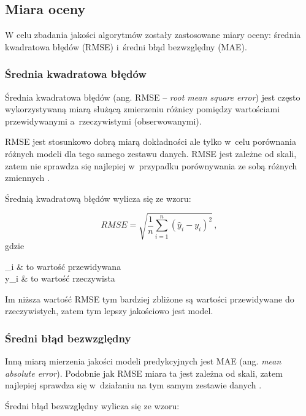 \documentclass[twoside]{iisthesis}
\begin{document}
		\subsection{Miara oceny}
		
		W celu zbadania jakości algorytmów zostały zastosowane miary oceny: średnia kwadratowa błędów (RMSE) i~średni błąd bezwzględny (MAE).
		
		\subsubsection{Średnia kwadratowa błędów}
	
		Średnia kwadratowa błędów (ang. RMSE -- \textit{root mean square error}) jest często wykorzystywaną miarą służącą zmierzeniu różnicy pomiędzy wartościami przewidywanymi a~rzeczywistymi (obserwowanymi). 
		
		RMSE jest stosunkowo dobrą miarą dokładności ale tylko w~celu porównania  różnych modeli dla tego samego zestawu danych. RMSE jest zależne od skali, zatem nie sprawdza się najlepiej w~przypadku porównywania ze sobą różnych zmiennych \cite{hyndman2006another}.
		
		Średnią kwadratową błędów wylicza się ze wzoru:
		
		\begin{equation}
			\label{eq:rmse}
			RMSE = \sqrt{ \frac{1}{n} \sum_{i=1}^{n} (\hat{y}_i - y_i)^2 }
			\,,
		\end{equation}	
		gdzie
		
		\begin{conditions*}
			_i & to wartość przewidywana \\
			y_i  &  to wartość rzeczywista
		\end{conditions*} 
		
		Im niższa wartość RMSE tym bardziej zbliżone są wartości przewidywane do rzeczywistych, zatem tym lepszy jakościowo jest model. 
		
		\subsubsection{Średni błąd bezwzględny}
		
		Inną miarą mierzenia jakości modeli predykcyjnych jest MAE (ang. \textit{mean absolute error}). Podobnie jak RMSE miara ta jest zależna od skali, zatem najlepiej sprawdza się w~działaniu na tym samym zestawie danych \cite{hyndman2006another}. 
		
		Średni błąd bezwzględny wylicza się ze wzoru:
		
\end{document}

